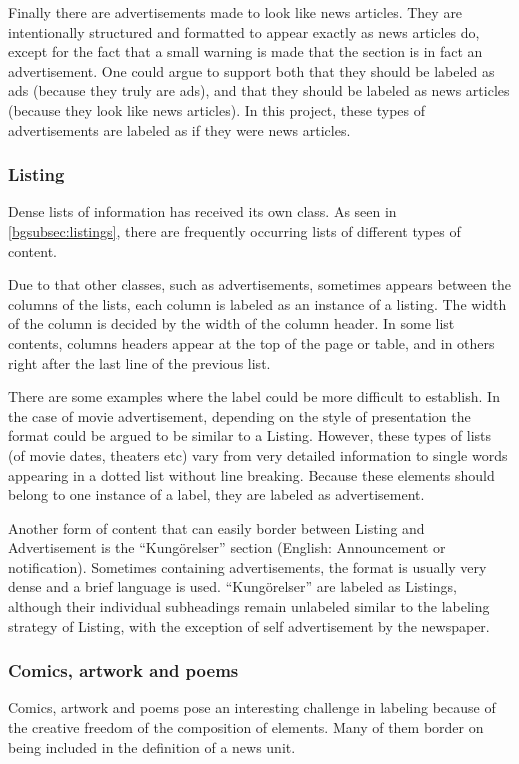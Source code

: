\documentclass[oneside, english, bibtex]{kththesis}
\begin{document}
Finally there are advertisements made to look like news articles.
They are intentionally structured and formatted to appear exactly as news articles do,
except for the fact that a small warning is made that the section is in fact an advertisement.
One could argue to support both that they should be labeled as ads (because they truly are ads), and that they should be labeled as news articles (because they look like news articles).
In this project, these types of advertisements are labeled as if they were news articles.

\subsubsection{Listing}

Dense lists of information has received its own class. As seen in \autoref{bgsubsec:listings},
there are frequently occurring lists of different types of content.

Due to that other classes, such as advertisements, sometimes appears between the columns of the lists, each column is labeled as an instance of a listing.
The width of the column is decided by the width of the column header. In some list contents, columns headers appear at the top of the page or table,
and in others right after the last line of the previous list.

There are some examples where the label could be more difficult to establish.
In the case of movie advertisement, depending on the style of presentation the format could be argued to be similar to a Listing.
However, these types of lists (of movie dates, theaters etc) vary from very detailed information to single words appearing in a dotted list without line breaking.
Because these elements should belong to one instance of a label, they are labeled as advertisement.

Another form of content that can easily border between Listing and Advertisement is the “Kungörelser” section (English: Announcement or notification).
Sometimes containing advertisements, the format is usually very dense and a brief language is used.
“Kungörelser” are labeled as Listings,
although their individual subheadings remain unlabeled similar to the labeling strategy of Listing,
with the exception of self advertisement by the newspaper.

\subsubsection{Comics, artwork and poems}
Comics, artwork and poems pose an interesting challenge in labeling because of the creative freedom of the composition of elements.
Many of them border on being included in the definition of a news unit.
\end{document}
